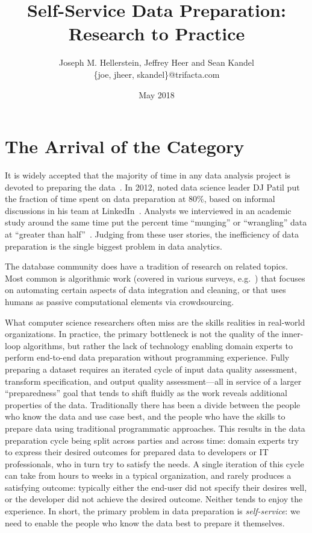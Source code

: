 \documentclass[11pt]{article}
\title{Self-Service Data Preparation: Research to Practice}
\author{Joseph M. Hellerstein, Jeffrey Heer and Sean Kandel\\
{\small \{joe, jheer, skandel\}@trifacta.com}}
\date{May 2018}
\begin{document}
\maketitle

\section{The Arrival of the Category}
It is widely accepted that the majority of time in any data analysis project is devoted to preparing the data~\cite{nyt-janitor}. In 2012, noted data science leader DJ Patil put the fraction of time spent on data preparation at 80\%, based on informal discussions in his team at LinkedIn~\cite{patil2012data}. Analysts we interviewed in an academic study around the same time put the percent time ``munging'' or ``wrangling'' data at ``greater than half''~\cite{interviews}. Judging from these user stories, the inefficiency of data preparation is the single biggest problem in data analytics.

The database community does have a tradition of research on related topics. Most common is algorithmic work (covered in various surveys, e.g.~\cite{ilyas2015trends,doan2012principles,chu2016data, marcus2015crowdsourced}) that focuses on automating certain aspects of data integration and cleaning, or that uses humans as passive computational elements via crowdsourcing. 

What computer science researchers often miss are the skills realities in real-world organizations. In practice, the primary bottleneck is not the quality of the inner-loop algorithms, but rather the lack of technology enabling domain experts to perform end-to-end data preparation without programming experience. Fully preparing a dataset requires an iterated cycle of input data quality assessment, transform specification, and output quality assessment---all in service of a larger ``preparedness'' goal that tends to shift fluidly as the work reveals additional properties of the data. Traditionally there has been a divide between the people who know the data and use case best, and the people who have the skills to prepare data using traditional programmatic approaches. This results in the data preparation cycle being split across parties and across time: domain experts try to express their desired outcomes for prepared data to developers or IT professionals, who in turn try to satisfy the needs. A single iteration of this cycle can take from hours to weeks in a typical organization, and rarely produces a satisfying outcome: typically either the end-user did not specify their desires well, or the developer did not achieve the desired outcome. Neither tends to enjoy the experience. In short, the primary problem in data preparation is \emph{self-service}: we need to enable the people who know the data best to prepare it themselves.
\end{document}
